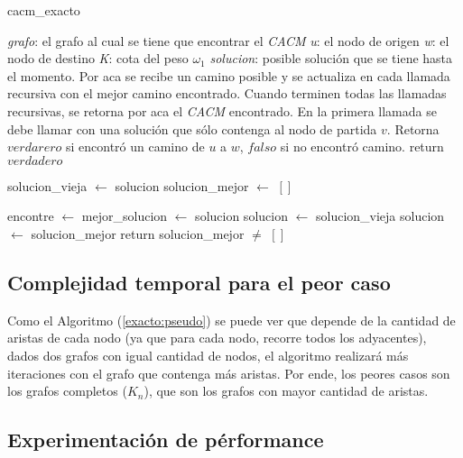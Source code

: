 \begin{algorithm}[!h]
\caption{cacm\_exacto} \label{exacto:pseudo}
\end{algorithm}
\begin{algorithmic}[1]
	\Require \emph{grafo}: el grafo al cual se tiene que encontrar el \emph{CACM}
	\Require \emph{u}: el nodo de origen
	\Require \emph{w}: el nodo de destino
	\Require \emph{K}: cota del peso $\omega_1$
	\Require \emph{solucion}: posible soluci\'on que se tiene hasta el momento. Por aca se recibe un camino posible y se actualiza en cada llamada recursiva con el mejor camino encontrado. Cuando terminen todas las llamadas recursivas, se retorna por aca el \emph{CACM} encontrado. En la primera llamada se debe llamar con una soluci\'on que s\'olo contenga al nodo de partida $v$.
	\Statex
	\Ensure Retorna $verdarero$ si encontr\'o un camino de $u$ a $w$, $falso$ si no encontr\'o camino.
	\Statex
			\State return $verdadero$
		\EndIf
		
		\State solucion\_vieja $\gets$ solucion
		\State solucion\_mejor $\gets$ $[]$

				\State {}
				\State {}
				\State encontre $\gets$ 
					\State mejor\_solucion $\gets$ solucion
				\EndIf
				\State {}
				\State solucion $\gets$ solucion\_vieja
			\EndIf
		\EndFor
			\State solucion $\gets$ solucion\_mejor
		\EndIf
		\State return solucion\_mejor $\neq$ $[]$
	\EndProcedure
\end{algorithmic}

\subsection{Complejidad temporal para el peor caso} \label{exacto:complejidad}

Como el Algoritmo (\ref{exacto:pseudo}) se puede ver que depende de la cantidad de aristas de cada nodo (ya que para cada nodo, recorre todos los adyacentes), dados dos grafos
con igual cantidad de nodos, el algoritmo realizar\'a m\'as iteraciones con el grafo que contenga m\'as aristas. Por ende, los peores casos son los grafos completos ($K_n$),
que son los grafos con mayor cantidad de aristas.

\subsection{Experimentaci\'on de p\'erformance} \label{exacto:experimentacion}

